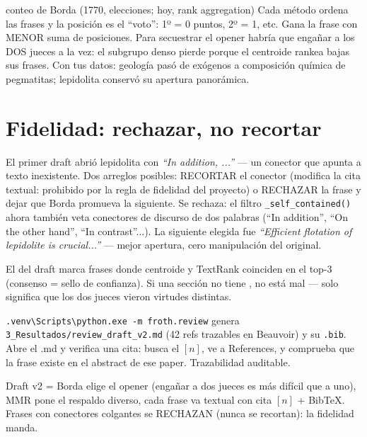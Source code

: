 \documentclass[11pt,a4paper]{article}
\begin{document}
\begin{concepto}{conteo de Borda (1770, elecciones; hoy, rank aggregation)}
Cada método ordena las frases y la posición es el ``voto'': 1º = 0 puntos, 2º = 1, etc.
Gana la frase con MENOR suma de posiciones. Para secuestrar el opener habría que engañar
a los DOS jueces a la vez: el subgrupo denso pierde porque el centroide rankea bajas sus
frases. Con tus datos: geología pasó de exógenos a composición química de pegmatitas;
lepidolita conservó su apertura panorámica.
\end{concepto}

\section{Fidelidad: rechazar, no recortar}

El primer draft abrió lepidolita con \emph{``In addition, ...''} --- un conector que
apunta a texto inexistente. Dos arreglos posibles: RECORTAR el conector (modifica la
cita textual: prohibido por la regla de fidelidad del proyecto) o RECHAZAR la frase y
dejar que Borda promueva la siguiente. Se rechaza: el filtro
\texttt{\_self\_contained()} ahora también veta conectores de discurso de dos palabras
(``In addition'', ``On the other hand'', ``In contrast''...). La siguiente elegida fue
\emph{``Efficient flotation of lepidolite is crucial...''} --- mejor apertura, cero
manipulación del original.

\begin{ojo}
El \dag{} del draft marca frases donde centroide y TextRank coinciden en el top-3
(consenso = sello de confianza). Si una sección no tiene \dag, no está mal --- solo
significa que los dos jueces vieron virtudes distintas.
\end{ojo}

\begin{practica}
\texttt{.venv\textbackslash Scripts\textbackslash python.exe -m froth.review} genera
\texttt{3\_Resultados/review\_draft\_v2.md} (42 refs trazables en Beauvoir) y su
\texttt{.bib}. Abre el .md y verifica una cita: busca el $[n]$, ve a References, y
comprueba que la frase existe en el abstract de ese paper. Trazabilidad auditable.
\end{practica}

\begin{resumen}
Draft v2 = Borda elige el opener (engañar a dos jueces es más difícil que a uno),
MMR pone el respaldo diverso, cada frase va textual con cita $[n]$ + BibTeX. Frases con
conectores colgantes se RECHAZAN (nunca se recortan): la fidelidad manda.
\end{resumen}
\clearpage
{}
{}
\end{document}
